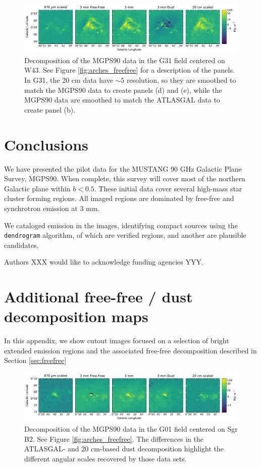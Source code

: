 \documentclass[twocolumn]{aastex62}
\begin{document}
\begin{figure}[htp]
    \includegraphics[width=17cm]{figures/G31_w43_5panel.pdf}
    \caption{Decomposition of the MGPS90 data in the G31 field centered on W43.
    See Figure \ref{fig:arches_freefree} for a description of the panels.
    In G31, the 20 cm data have $\sim5$ \arcsec resolution, so they are
    smoothed to match the MGPS90 data to create panels (d) and (e), while the
    MGPS90 data are smoothed to match the ATLASGAL data to create panel (b).
}
\label{fig:w43freefree}
\end{figure}





\section{Conclusions}
We have presented the pilot data for the MUSTANG 90 GHz Galactic Plane
Survey, MGPS90.  When complete, this survey
will cover most of the northern Galactic plane within $b<0.5$.
These initial data cover several high-mass star cluster
forming regions.  All imaged regions are dominated by free-free and synchrotron
emission at 3 mm.  

We cataloged emission in the images, identifying \nsources compact sources using the
\texttt{dendrogram} algorithm, of which \ncompacthiicand are verified \hchii
regions, and another \mmdetectionscmnondetectionscompact are plausible
candidates.  

\acknowledgements
Authors XXX would like to acknowledge funding agencies YYY.


\appendix

\section{Additional free-free / dust decomposition maps}
In this appendix, we show cutout images focused on a selection of bright extended emission regions
and the associated free-free decomposition described in Section \ref{sec:freefree}

\begin{figure}[htp]
    \includegraphics[width=17cm]{figures/G01_sgrb2_5panel.pdf}
    \caption{Decomposition of the MGPS90 data in the G01 field centered on Sgr B2.
    See Figure \ref{fig:arches_freefree}.
    The differences in the ATLASGAL- and 20 cm-based dust decomposition highlight the
    different angular scales recovered by those data sets.
}
\label{fig:sgrb2freefree}
\end{figure}
\end{document}
